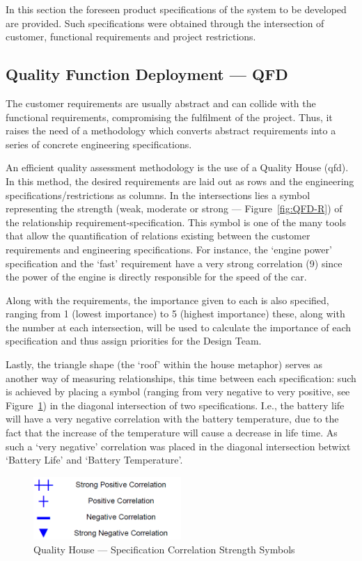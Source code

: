 In this section the foreseen product specifications of the system to be developed are provided. Such specifications were obtained through the intersection of customer, functional requirements and project restrictions.
\subsection{Quality Function Deployment --- QFD}%
\label{sec:qfd}
The customer requirements are usually abstract and can collide with the functional requirements, compromising the fulfilment of the project. Thus, it raises the need of a methodology which converts abstract requirements into a series of concrete engineering specifications.

An efficient quality assessment methodology is the use of a Quality House
(\gls{qfd}). In this method, the desired requirements are laid out as rows and
the engineering specifications/restrictions as columns. In the intersections
lies a symbol representing the strength (weak, moderate or strong --- Figure~\ref{fig:QFD-R}) of the relationship requirement-specification. This symbol is one of the many tools that allow the quantification of relations existing between the customer requirements and engineering specifications.
For instance, the `engine power' specification and the `fast' requirement have a
very strong correlation (9) since the power of the engine is directly
responsible for the speed of the car.

Along with the requirements, the importance given to each is also specified, ranging from 1 (lowest importance) to 5 (highest importance) these, along with the number at each intersection, will be used to calculate the importance of each specification and thus assign priorities for the Design Team.

Lastly, the triangle shape (the `roof' within the house metaphor) serves as another way of measuring relationships, this time between each specification: such is achieved by placing a symbol (ranging from very negative to very positive, see Figure~\ref{fig:QFD-Roof}) in the diagonal intersection of two specifications. 
I.e., the battery life will have a very negative correlation with the battery temperature, due to the fact that the increase of the temperature will cause a decrease in life time. As such a `very negative' correlation was placed in the diagonal intersection betwixt `Battery Life' and `Battery Temperature'. 
\begin{figure}[!htbp]
   \centering
       \includegraphics[page=1,width=0.5\textwidth]{sec/img/Roof_Symbols.png} 
 \caption{Quality House --- Specification Correlation Strength Symbols}%
\label{fig:QFD-Roof}
\end{figure}


